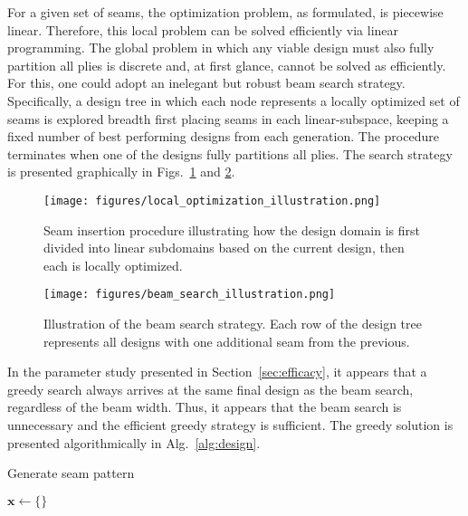 For a given set of seams, the optimization problem, as formulated, is piecewise linear. Therefore, this local problem can be solved efficiently via linear programming. The global problem in which any viable design must also fully partition all plies is discrete and, at first glance, cannot be solved as efficiently. For this, one could adopt an inelegant but robust beam search strategy. Specifically, a design tree in which each node represents a locally optimized set of seams is explored breadth first placing seams in each linear-subspace, keeping a fixed number of best performing designs from each generation. 
The procedure terminates when one of the designs fully partitions all plies. The search strategy is presented graphically in Figs.~\ref{fig:local_optimization_illustration} and \ref{fig:beam_search_illustration}. 

\begin{figure}
    \centering
    \texttt{[image: figures/local\_optimization\_illustration.png]}
    \caption{Seam insertion procedure illustrating how the design domain is first divided into linear subdomains based on the current design, then each is locally optimized.}
    \label{fig:local_optimization_illustration}
\end{figure}

\begin{figure}
    \centering
    \texttt{[image: figures/beam\_search\_illustration.png]}
    \caption{Illustration of the beam search strategy. Each row of the design tree represents all designs with one additional seam from the previous.}
    \label{fig:beam_search_illustration}
\end{figure}

In the parameter study presented in Section~\ref{sec:efficacy}, it appears that a greedy search always arrives at the same final design as the beam search, regardless of the beam width. Thus, it appears that the beam search is unnecessary and the efficient greedy strategy is sufficient. The greedy solution is presented algorithmically in Alg.~\ref{alg:design}.

\begin{algorithm}[t]
\caption{Generate seam pattern}\label{alg:design}
$\mathbf{x} \gets \{\}$ \\
\end{algorithm}


